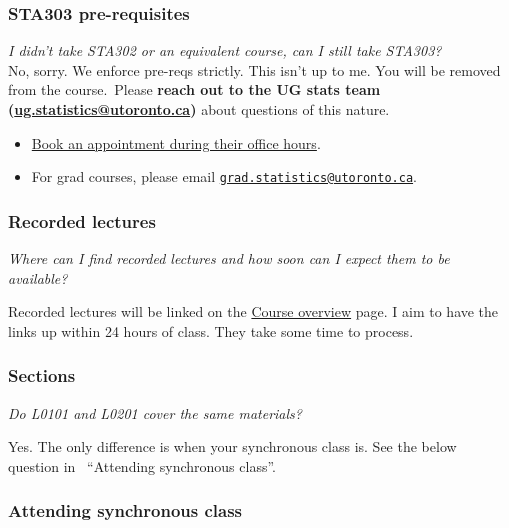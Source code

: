 \documentclass[
  openany]{book}
\begin{document}
\hypertarget{prereq-faq}{%
\subsubsection{STA303 pre-requisites}\label{prereq-faq}}

\emph{I didn't take STA302 or an equivalent course, can I still take STA303?}\\
No, sorry. We enforce pre-reqs strictly. This isn't up to me. You will be removed from the course.~Please \textbf{reach out to the UG stats team (\url{ug.statistics@utoronto.ca})} about questions of this nature.

\begin{itemize}
\item
  \href{https://outlook.office365.com/owa/calendar/DepartmentofStatisticalSciencesUndergraduate@utoronto.onmicrosoft.com/bookings/}{Book an appointment during their office hours}.
\item
  For grad courses, please email \href{mailto:grad.statistics@utoronto.ca}{\nolinkurl{grad.statistics@utoronto.ca}}.
\end{itemize}

\hypertarget{recorded-lectures}{%
\subsubsection{Recorded lectures}\label{recorded-lectures}}

\emph{Where can I find recorded lectures and how soon can I expect them to be available?}

Recorded lectures will be linked on the \href{https://q.utoronto.ca/courses/204826/pages/course-overview}{Course overview} page. I aim to have the links up within 24 hours of class. They take some time to process.

\hypertarget{sections}{%
\subsubsection{Sections}\label{sections}}

\emph{Do L0101 and L0201 cover the same materials?}

Yes. The only difference is when your synchronous class is. See the below question in~ ``Attending synchronous class''.

\hypertarget{attending-synchronous-class}{%
\subsubsection{Attending synchronous class}\label{attending-synchronous-class}}
\end{document}

